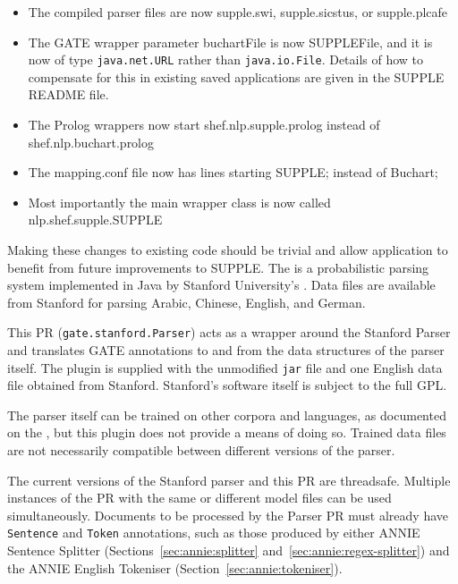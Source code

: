 \begin{itemize}
\item The compiled parser files are now supple.swi, supple.sicstus, or supple.plcafe
\item The GATE wrapper parameter buchartFile is now SUPPLEFile, and it is now
of type {\tt java.net.URL} rather than {\tt java.io.File}.  Details of how to
compensate for this in existing saved applications are given in the SUPPLE
README file.
\item The Prolog wrappers now start shef.nlp.supple.prolog instead of shef.nlp.buchart.prolog
\item The mapping.conf file now has lines starting SUPPLE; instead of Buchart;
\item Most importantly the main wrapper class is now called nlp.shef.supple.SUPPLE
\end{itemize}

Making these changes to existing code should be trivial and allow application
to benefit from future improvements to SUPPLE.
The 
is a probabilistic parsing system implemented in Java by Stanford University's
.  Data
files are available from Stanford for parsing Arabic, Chinese, English, and
German.


This PR (\texttt{gate.stanford.Parser}) acts as a wrapper around the Stanford
Parser and translates GATE annotations to and from the data
structures of the parser itself.  The plugin is supplied with the unmodified
\texttt{jar} file and one English data file obtained from Stanford.  Stanford's
software itself is subject to the full GPL.


The parser itself can be trained on other corpora and languages, as documented
on the , but
this plugin does not provide a means of doing so.  Trained data files are not
necessarily compatible between different versions of the parser.

The current versions of the Stanford parser and this PR are threadsafe.
Multiple instances of the PR with the same or different model files can be used
simultaneously.
%
%
Documents to be processed by the Parser PR must already have
\texttt{Sentence} and \texttt{Token} annotations, such as those
produced by either ANNIE Sentence Splitter
(Sections~\ref{sec:annie:splitter} and~\ref{sec:annie:regex-splitter}) and the
ANNIE English Tokeniser (Section~\ref{sec:annie:tokeniser}).

